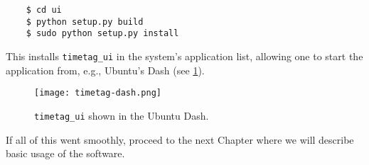 \begin{verbatim}
    $ cd ui
    $ python setup.py build
    $ sudo python setup.py install
\end{verbatim}

This installs {\tt timetag\_ui} in the system's application list,
allowing one to start the application from, e.g., Ubuntu's Dash (see
\ref{Fig:Dash}).

\begin{figure}
  \center
  \texttt{[image: timetag-dash.png]}
  \caption{{\tt timetag\_ui} shown in the Ubuntu Dash.}
  \label{Fig:Dash}
\end{figure}

If all of this went smoothly, proceed to the next Chapter where we
will describe basic usage of the software.
